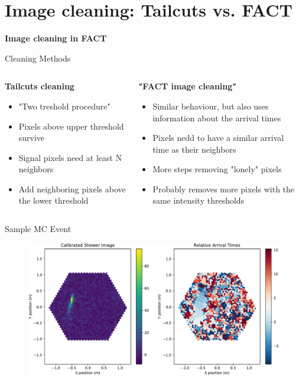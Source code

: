 \section{Image cleaning: Tailcuts vs. FACT}

\begin{frame}
    \centering
    {\Huge \textbf{Image cleaning in FACT}}
\end{frame}

\begin{frame}{Cleaning Methods}
    \begin{columns}[T] %
        \begin{column}{.48\textwidth}
            \textbf{Tailcuts cleaning}
            \vspace{8pt}
            \begin{itemize}
                \item "Two treshold procedure"
                \item Pixels above upper threshold survive
                \item Signal pixels need at least N neighbors
                \item Add neighboring pixels above the lower threshold
            \end{itemize}
        \end{column}
        \begin{column}{.48\textwidth}
            \textbf{"FACT image cleaning"}
            \vspace{8pt}
            \begin{itemize}
                \item Similar behaviour, but also uses information about the arrival times
                \item Pixels nedd to have a similar arrival time as their neighbors
                \item More steps removing "lonely" pixels
                \item[\rightarrow] Probably removes more pixels with the same intensity thresholds
            \end{itemize}
        \end{column}
    \end{columns}
\end{frame}

\begin{frame}{Sample MC Event}
    \begin{figure}
        \includegraphics[width=0.85\linewidth]{images/cleaning_plots/raw-crop.pdf}
    \end{figure}
\end{frame}



